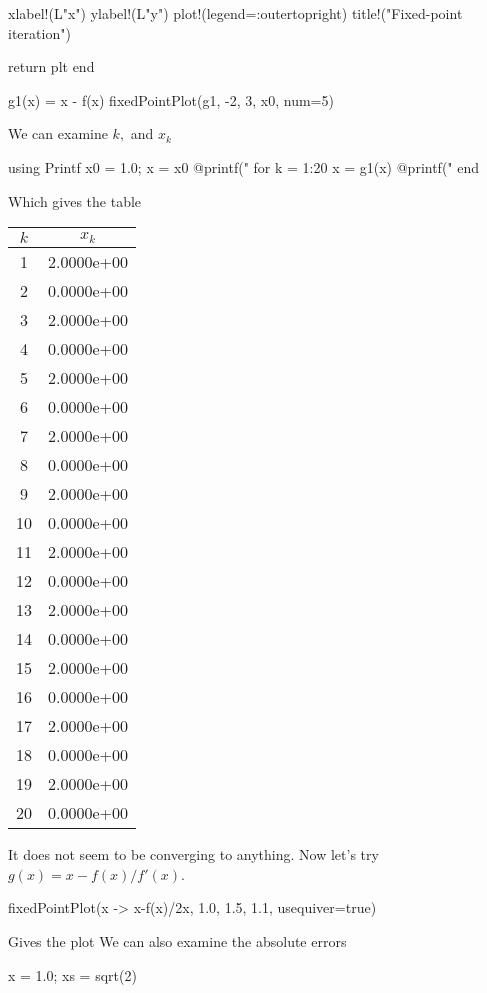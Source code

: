 \documentclass{report}
\begin{document}
\begin{itemize}
\begin{jlcode}
    xlabel!(L"x")
    ylabel!(L"y")
    plot!(legend=:outertopright)
    title!("Fixed-point iteration")
    
    return plt
end

g1(x) = x - f(x)
fixedPointPlot(g1, -2, 3, x0, num=5)
    \end{jlcode}
    \bigbreak \noindent 
    \bigbreak \noindent 
    We can examine $k,$ and $x_{k}$
    \bigbreak \noindent 
    \begin{jlcode}
using Printf
x0 = 1.0; x = x0
@printf("%
for k = 1:20
    x = g1(x)
    @printf("%
end 
    \end{jlcode}
    \bigbreak \noindent 
    Which gives the table
    \bigbreak \noindent 
    \begin{center}
        \begin{tabular}{c c}
            \hline
            $k$ & $x_k$ \\
            \hline
            1  & 2.0000e+00 \\
            2  & 0.0000e+00 \\
            3  & 2.0000e+00 \\
            4  & 0.0000e+00 \\
            5  & 2.0000e+00 \\
            6  & 0.0000e+00 \\
            7  & 2.0000e+00 \\
            8  & 0.0000e+00 \\
            9  & 2.0000e+00 \\
            10 & 0.0000e+00 \\
            11 & 2.0000e+00 \\
            12 & 0.0000e+00 \\
            13 & 2.0000e+00 \\
            14 & 0.0000e+00 \\
            15 & 2.0000e+00 \\
            16 & 0.0000e+00 \\
            17 & 2.0000e+00 \\
            18 & 0.0000e+00 \\
            19 & 2.0000e+00 \\
            20 & 0.0000e+00 \\
            \hline
        \end{tabular}
    \end{center}
    \bigbreak \noindent 
    It does not seem to be converging to anything. Now let's try $g(x) = x - f(x)\big/f'(x)$.
    \bigbreak \noindent 
    \begin{jlcode}
    fixedPointPlot(x -> x-f(x)/2x, 1.0, 1.5, 1.1, usequiver=true)
    \end{jlcode}
    \bigbreak \noindent 
    Gives the plot
    \bigbreak \noindent 
    \bigbreak \noindent 
    We can also examine the absolute errors
    \bigbreak \noindent 
    \begin{jlcode}
x = 1.0; xs = sqrt(2)


\end{jlcode}
\end{itemize}
\end{document}
